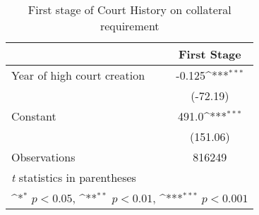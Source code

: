 \begin{table}[htbp]\centering
\def\sym#1{\ifmmode^{#1}\else\(^{#1}\)\fi}
\caption{First stage of Court History on collateral requirement}
\begin{tabular}{l*{1}{c}}
\toprule
                    &\multicolumn{1}{c}{First Stage}\\
\midrule
Year of high court creation&      -0.125\sym{***}\\
                    &    (-72.19)         \\
\addlinespace
Constant            &       491.0\sym{***}\\
                    &    (151.06)         \\
\midrule
Observations        &      816249         \\
\bottomrule
\multicolumn{2}{l}{\footnotesize \textit{t} statistics in parentheses}\\
\multicolumn{2}{l}{\footnotesize \sym{*} \(p<0.05\), \sym{**} \(p<0.01\), \sym{***} \(p<0.001\)}\\
\end{tabular}
\end{table}
